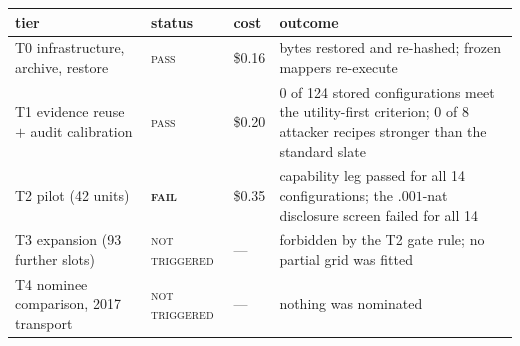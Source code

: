 \begin{tabular}{@{}l l l p{6.6cm}@{}}
\toprule
tier & status & cost & outcome \\
\midrule
T0 infrastructure, archive, restore & \textsc{pass} & \$0.16 & bytes restored and re-hashed; frozen mappers re-execute \\
T1 evidence reuse $+$ audit calibration & \textsc{pass} & \$0.20 & 0 of 124 stored configurations meet the utility-first criterion; 0 of 8 attacker recipes stronger than the standard slate \\
T2 pilot (42 units) & \textbf{\textsc{fail}} & \$0.35 & capability leg passed for all 14 configurations; the $.001$-nat disclosure screen failed for all 14 \\
T3 expansion (93 further slots) & \textsc{not triggered} & --- & forbidden by the T2 gate rule; no partial grid was fitted \\
T4 nominee comparison, 2017 transport & \textsc{not triggered} & --- & nothing was nominated \\
\bottomrule
\end{tabular}
